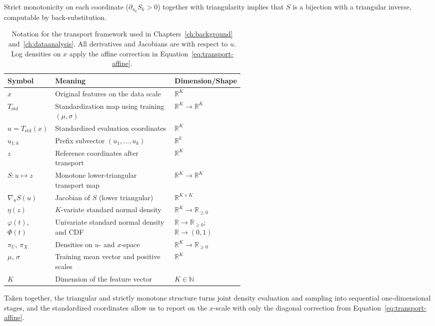 \documentclass[11pt,a4paper,twoside]{book}\usepackage[]{graphicx}\usepackage[]{xcolor}
\begin{document}
Strict monotonicity on each coordinate ($\partial_{u_k} S_k>0$) together with triangularity implies that $S$ is a bijection with a triangular inverse, computable by back-substitution.

\begin{table}[t]
  \centering
  \caption{Notation for the transport framework used in Chapters~\ref{ch:background} and~\ref{ch:dataanalysis}. All derivatives and Jacobians are with respect to $u$. Log densities on $x$ apply the affine correction in Equation~\eqref{eq:transport-affine}.}
  \label{tab:transport-notation}
  \begin{tabular}{@{} l p{0.55\linewidth} l @{}}
    \hline
    Symbol & Meaning & Dimension/Shape \\
    \hline
    $x$ & Original features on the data scale & $\mathbb{R}^K$ \\
    $T_{\mathrm{std}}$ & Standardization map using training $(\mu,\sigma)$ & $\mathbb{R}^K \to \mathbb{R}^K$ \\
    $u = T_{\mathrm{std}}(x)$ & Standardized evaluation coordinates & $\mathbb{R}^K$ \\
    $u_{1:k}$ & Prefix subvector $(u_1,\dots,u_k)$ & $\mathbb{R}^k$ \\
    $z$ & Reference coordinates after transport & $\mathbb{R}^K$ \\
    $S: u \mapsto z$ & Monotone lower-triangular transport map & $\mathbb{R}^K \to \mathbb{R}^K$ \\
    $\nabla_u S(u)$ & Jacobian of $S$ (lower triangular) & $\mathbb{R}^{K \times K}$ \\
    $\eta(z)$ & $K$-variate standard normal density & $\mathbb{R}^K \to \mathbb{R}_{\ge 0}$ \\
    $\varphi(t)$, $\Phi(t)$ & Univariate standard normal density and CDF & $\mathbb{R} \to \mathbb{R}_{\ge 0}$; $\mathbb{R} \to (0,1)$ \\
    $\pi_U$, $\pi_X$ & Densities on $u$- and $x$-space & $\mathbb{R}^K \to \mathbb{R}_{\ge 0}$ \\
    $\mu$, $\sigma$ & Training mean vector and positive scales & $\mathbb{R}^K$ \\
    $K$ & Dimension of the feature vector & $K \in \mathbb{N}$ \\
    \hline
  \end{tabular}
\end{table}


Taken together, the triangular and strictly monotone structure turns joint density evaluation
and sampling into sequential one-dimensional stages, and the standardized coordinates allow us
to report on the $x$-scale with only the diagonal correction from Equation~\eqref{eq:transport-affine}.
\end{document}

